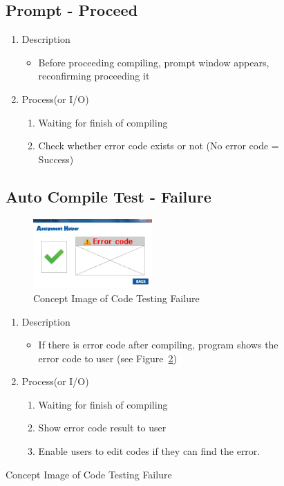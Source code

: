 \documentclass[conference]{IEEEtran}
\begin{document}
\begin{itemize}
\begin{itemize}
\begin{itemize}
\begin{itemize}
\begin{figure}[h]
\begin{enumerate}
\begin{itemize}
\begin{enumerate}
\subsection{Prompt - Proceed}
\begin{enumerate}
  \item Description
  \begin{itemize}
    \item Before proceeding compiling, prompt window appears, reconfirming proceeding it
  \end{itemize}
  \item Process(or I/O)
  \begin{enumerate}
    \item Waiting for finish of compiling
    \item Check whether error code exists or not (No error code = Success)
  \end{enumerate}
\end{enumerate}

\textit{}

\subsection{Auto Compile Test - Failure}

\textit{}
\begin{figure}[ht]
\centering
\includegraphics[width=0.5\textwidth]{./figures/UI_code_validation_fail.jpg}
\caption{Concept Image of Code Testing Failure}
\label{fig_concept_fail}
\end{figure}


\begin{enumerate}
  \item Description
  \begin{itemize}
    \item If there is error code after compiling, program shows the error code to user (see Figure~\ref{fig_concept_fail})
  \end{itemize}
  \item Process(or I/O)
  \begin{enumerate}
    \item Waiting for finish of compiling
    \item Show error code result to user
    \item Enable users to edit codes if they can find the error.
  \end{enumerate}
\end{enumerate}


\end{enumerate}
\end{itemize}
\end{enumerate}
\end{figure}
\end{itemize}
\end{itemize}
\end{itemize}
\end{itemize}
\end{document}

